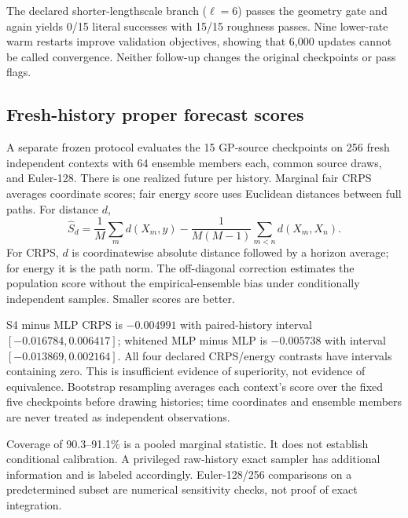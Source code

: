 \documentclass[10pt,twocolumn]{article}
\begin{document}
The declared shorter-lengthscale branch ($\ell=6$) passes the geometry gate and again yields 0/15 literal successes with 15/15 roughness passes. Nine lower-rate warm restarts improve validation objectives, showing that 6,000 updates cannot be called convergence. Neither follow-up changes the original checkpoints or pass flags.

\subsection{Fresh-history proper forecast scores}
A separate frozen protocol evaluates the 15 GP-source checkpoints on 256 fresh independent contexts with 64 ensemble members each, common source draws, and Euler-128. There is one realized future per history. Marginal fair CRPS averages coordinate scores; fair energy score uses Euclidean distances between full paths. For distance $d$,
\begin{equation}
 \widehat S_d=\frac1M\sum_m d(X_m,y)-\frac1{M(M-1)}\sum_{m<n}d(X_m,X_n).
\end{equation}
For CRPS, $d$ is coordinatewise absolute distance followed by a horizon average; for energy it is the path norm. The off-diagonal correction estimates the population score without the empirical-ensemble bias under conditionally independent samples. Smaller scores are better.
\begin{table}[h]
\centering\small
\caption{Fresh-history forecast evaluation. Cov90 is marginal empirical 90\% interval coverage, not simultaneous coverage.}\label{tab:ensemble}
\end{table}


S4 minus MLP CRPS is $-0.004991$ with paired-history interval $[-0.016784,0.006417]$; whitened MLP minus MLP is $-0.005738$ with interval $[-0.013869,0.002164]$. All four declared CRPS/energy contrasts have intervals containing zero. This is insufficient evidence of superiority, not evidence of equivalence. Bootstrap resampling averages each context's score over the fixed five checkpoints before drawing histories; time coordinates and ensemble members are never treated as independent observations.

Coverage of 90.3--91.1\% is a pooled marginal statistic. It does not establish conditional calibration. A privileged raw-history exact sampler has additional information and is labeled accordingly. Euler-128/256 comparisons on a predetermined subset are numerical sensitivity checks, not proof of exact integration.
\end{document}
